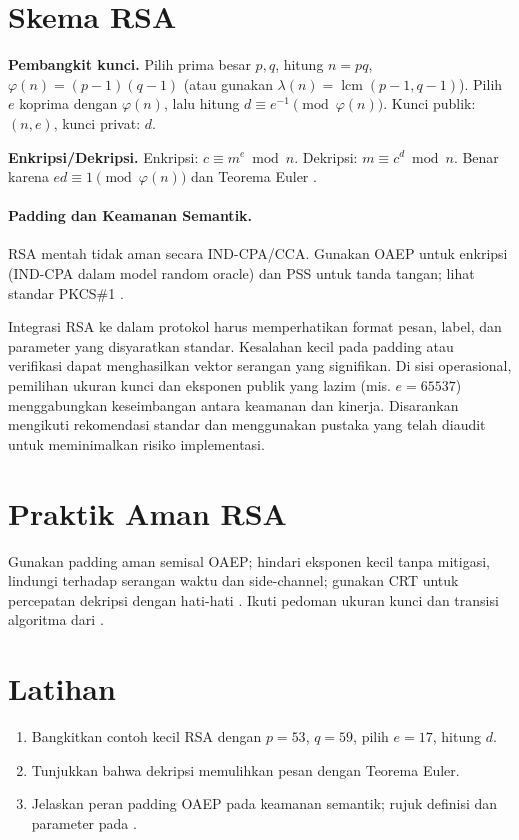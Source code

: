 \documentclass[../main.tex]{subfiles}
\begin{document}
\section{Skema RSA}
\textbf{Pembangkit kunci.} Pilih prima besar \(p,q\), hitung \(n=pq\), \(\varphi(n)=(p-1)(q-1)\) (atau gunakan \(\lambda(n)=\operatorname{lcm}(p-1,q-1)\)). Pilih \(e\) koprima dengan \(\varphi(n)\), lalu hitung \(d\equiv e^{-1}\pmod{\varphi(n)}\). Kunci publik: \((n,e)\), kunci privat: \(d\).

\textbf{Enkripsi/Dekripsi.} Enkripsi: \(c\equiv m^e\bmod n\). Dekripsi: \(m\equiv c^d\bmod n\). Benar karena \(ed\equiv 1\pmod{\varphi(n)}\) dan Teorema Euler \citep{rsa}.

\paragraph{Padding dan Keamanan Semantik.} RSA mentah tidak aman secara IND-CPA/CCA. Gunakan OAEP untuk enkripsi (IND-CPA dalam model random oracle) dan PSS untuk tanda tangan; lihat standar PKCS\#1 \citep{rfc8017}.

Integrasi RSA ke dalam protokol harus memperhatikan format pesan, label, dan parameter yang disyaratkan standar. Kesalahan kecil pada padding atau verifikasi dapat menghasilkan vektor serangan yang signifikan. Di sisi operasional, pemilihan ukuran kunci dan eksponen publik yang lazim (mis. \(e=65537\)) menggabungkan keseimbangan antara keamanan dan kinerja. Disarankan mengikuti rekomendasi standar dan menggunakan pustaka yang telah diaudit untuk meminimalkan risiko implementasi.

\section{Praktik Aman RSA}
Gunakan padding aman semisal OAEP; hindari eksponen kecil tanpa mitigasi, lindungi terhadap serangan waktu dan side-channel; gunakan CRT untuk percepatan dekripsi dengan hati-hati \citep{katzlindell,menezes}. Ikuti pedoman ukuran kunci dan transisi algoritma dari \citep{nist_sp_800_131a}.

\section{Latihan}
\begin{enumerate}
  \item Bangkitkan contoh kecil RSA dengan \(p=53\), \(q=59\), pilih \(e=17\), hitung \(d\).
  \item Tunjukkan bahwa dekripsi memulihkan pesan dengan Teorema Euler.
  \item Jelaskan peran padding OAEP pada keamanan semantik; rujuk definisi dan parameter pada \citep{rfc8017}.
\end{enumerate}
\end{document}
